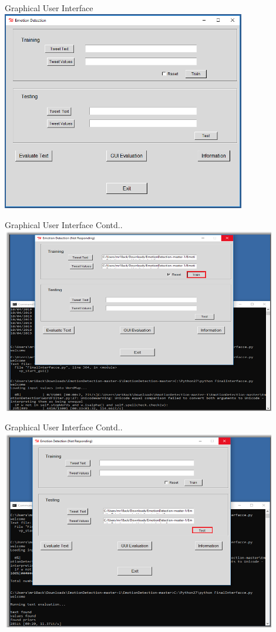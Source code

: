 \documentclass{beamer}
\begin{document}
\begin{frame}{Graphical User Interface}
\centering
    \includegraphics[width=0.8\textwidth]{Overview.png}
\end {frame}
\begin{frame}{Graphical User Interface Contd..}
\centering
    \includegraphics[width=0.9\textwidth]{Training.png}
\end {frame}
\begin{frame}{Graphical User Interface Contd..}
\centering
    \includegraphics[width=0.9\textwidth]{Test.png}
\end {frame}
\end{document}
